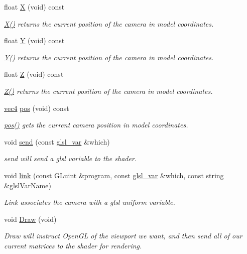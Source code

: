 \begin{DoxyCompactItemize}
float \hyperlink{class_camera_a2f7fd64d5d6e0dfb5edcca53c7d15994}{\-X} (void) const 
\begin{DoxyCompactList}\small\item\em \hyperlink{class_camera_a2f7fd64d5d6e0dfb5edcca53c7d15994}{\-X()} returns the current position of the camera in model coordinates. \end{DoxyCompactList}\item 
float \hyperlink{class_camera_a37529ef93871f547ebfd5862bc6cce62}{\-Y} (void) const 
\begin{DoxyCompactList}\small\item\em \hyperlink{class_camera_a37529ef93871f547ebfd5862bc6cce62}{\-Y()} returns the current position of the camera in model coordinates. \end{DoxyCompactList}\item 
float \hyperlink{class_camera_abf1730e47e8e51c76acbddcaa85e2475}{\-Z} (void) const 
\begin{DoxyCompactList}\small\item\em \hyperlink{class_camera_abf1730e47e8e51c76acbddcaa85e2475}{\-Z()} returns the current position of the camera in model coordinates. \end{DoxyCompactList}\item 
\hyperlink{struct_angel_1_1vec4}{vec4} \hyperlink{class_camera_a9982ac5f48fe0af97fefa725080d6da6}{pos} (void) const 
\begin{DoxyCompactList}\small\item\em \hyperlink{class_camera_a9982ac5f48fe0af97fefa725080d6da6}{pos()} gets the current camera position in model coordinates. \end{DoxyCompactList}\item 
void \hyperlink{class_camera_a36cba68c08136242bf5d906f9c0b610c}{send} (const \hyperlink{class_camera_a6ff726a75a430e4f17e5dec42e4d4405}{glsl\-\_\-var} \&which)
\begin{DoxyCompactList}\small\item\em send will send a glsl variable to the shader. \end{DoxyCompactList}\item 
void \hyperlink{class_camera_ad02f12a279c33e7e85dcaf88830d38c7}{link} (const \-G\-Luint \&program, const \hyperlink{class_camera_a6ff726a75a430e4f17e5dec42e4d4405}{glsl\-\_\-var} \&which, const string \&glsl\-Var\-Name)
\begin{DoxyCompactList}\small\item\em \-Link associates the camera with a glsl uniform variable. \end{DoxyCompactList}\item 
void \hyperlink{class_camera_a9d96971546c610e534f603a0f41e32b2}{\-Draw} (void)
\begin{DoxyCompactList}\small\item\em \-Draw will instruct \-Open\-G\-L of the viewport we want, and then send all of our current matrices to the shader for rendering. \end{DoxyCompactList}\end{DoxyCompactItemize}
